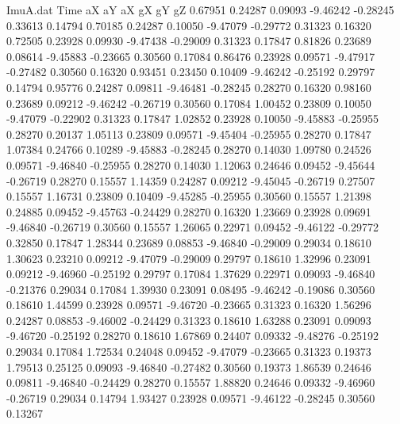 \begin{filecontents}{ImuA.dat}
Time aX aY aX gX gY gZ
   0.67951    0.24287    0.09093   -9.46242   -0.28245    0.33613    0.14794
   0.70185    0.24287    0.10050   -9.47079   -0.29772    0.31323    0.16320
   0.72505    0.23928    0.09930   -9.47438   -0.29009    0.31323    0.17847
   0.81826    0.23689    0.08614   -9.45883   -0.23665    0.30560    0.17084
   0.86476    0.23928    0.09571   -9.47917   -0.27482    0.30560    0.16320
   0.93451    0.23450    0.10409   -9.46242   -0.25192    0.29797    0.14794
   0.95776    0.24287    0.09811   -9.46481   -0.28245    0.28270    0.16320
   0.98160    0.23689    0.09212   -9.46242   -0.26719    0.30560    0.17084
   1.00452    0.23809    0.10050   -9.47079   -0.22902    0.31323    0.17847
   1.02852    0.23928    0.10050   -9.45883   -0.25955    0.28270    0.20137
   1.05113    0.23809    0.09571   -9.45404   -0.25955    0.28270    0.17847
   1.07384    0.24766    0.10289   -9.45883   -0.28245    0.28270    0.14030
   1.09780    0.24526    0.09571   -9.46840   -0.25955    0.28270    0.14030
   1.12063    0.24646    0.09452   -9.45644   -0.26719    0.28270    0.15557
   1.14359    0.24287    0.09212   -9.45045   -0.26719    0.27507    0.15557
   1.16731    0.23809    0.10409   -9.45285   -0.25955    0.30560    0.15557
   1.21398    0.24885    0.09452   -9.45763   -0.24429    0.28270    0.16320
   1.23669    0.23928    0.09691   -9.46840   -0.26719    0.30560    0.15557
   1.26065    0.22971    0.09452   -9.46122   -0.29772    0.32850    0.17847
   1.28344    0.23689    0.08853   -9.46840   -0.29009    0.29034    0.18610
   1.30623    0.23210    0.09212   -9.47079   -0.29009    0.29797    0.18610
   1.32996    0.23091    0.09212   -9.46960   -0.25192    0.29797    0.17084
   1.37629    0.22971    0.09093   -9.46840   -0.21376    0.29034    0.17084
   1.39930    0.23091    0.08495   -9.46242   -0.19086    0.30560    0.18610
   1.44599    0.23928    0.09571   -9.46720   -0.23665    0.31323    0.16320
   1.56296    0.24287    0.08853   -9.46002   -0.24429    0.31323    0.18610
   1.63288    0.23091    0.09093   -9.46720   -0.25192    0.28270    0.18610
   1.67869    0.24407    0.09332   -9.48276   -0.25192    0.29034    0.17084
   1.72534    0.24048    0.09452   -9.47079   -0.23665    0.31323    0.19373
   1.79513    0.25125    0.09093   -9.46840   -0.27482    0.30560    0.19373
   1.86539    0.24646    0.09811   -9.46840   -0.24429    0.28270    0.15557
   1.88820    0.24646    0.09332   -9.46960   -0.26719    0.29034    0.14794
   1.93427    0.23928    0.09571   -9.46122   -0.28245    0.30560    0.13267

\end{filecontents}

